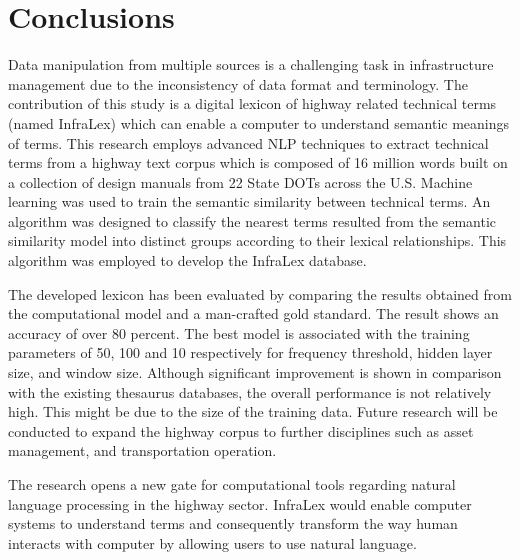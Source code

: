 \documentclass[Journal, BackFigs, DoubleSpace]{ascelike} %
\begin{document}
\section{Conclusions} \label{sec:conclns3} 
Data manipulation from multiple sources is a challenging task in infrastructure management due to the inconsistency of data format and terminology. The contribution of this study is a digital lexicon of highway related technical terms (named InfraLex) which can enable a computer to understand semantic meanings of terms.  This research employs advanced NLP techniques to extract technical terms from a highway text corpus which is composed of 16 million words built on a collection of design manuals from 22 State DOTs across the U.S. Machine learning was used to train the semantic similarity between technical terms. An algorithm was designed to classify the nearest terms resulted from the semantic similarity model into distinct groups according to their lexical relationships. This algorithm was employed to develop the InfraLex database. 
\par
The developed lexicon has been evaluated by comparing the results obtained from the computational model and a man-crafted gold standard. The result shows an accuracy of over 80 percent.  The best model is associated with the training parameters of 50, 100 and 10 respectively for frequency threshold, hidden layer size, and window size. Although significant improvement is shown in comparison with the existing thesaurus databases, the overall performance is not relatively high. This might be due to the size of the training data. Future research will be conducted to expand the highway corpus to further disciplines such as asset management, and transportation operation. 
\par
The research opens a new gate for computational tools regarding natural language processing in the highway sector. InfraLex would enable computer systems to understand terms and consequently transform the way human interacts with computer by allowing users to use natural language. 


%
%
\end{document}
